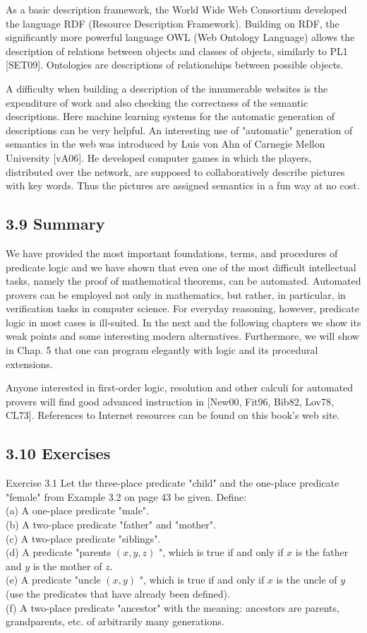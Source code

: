 \documentclass[10pt]{article}
\begin{document}
As a basic description framework, the World Wide Web Consortium developed the language RDF (Resource Description Framework). Building on RDF, the significantly more powerful language OWL (Web Ontology Language) allows the description of relations between objects and classes of objects, similarly to PL1 [SET09]. Ontologies are descriptions of relationships between possible objects.

A difficulty when building a description of the innumerable websites is the expenditure of work and also checking the correctness of the semantic descriptions. Here machine learning systems for the automatic generation of descriptions can be very helpful. An interesting use of "automatic" generation of semantics in the web was introduced by Luis von Ahn of Carnegie Mellon University [vA06]. He developed computer games in which the players, distributed over the network, are supposed to collaboratively describe pictures with key words. Thus the pictures are assigned semantics in a fun way at no cost.

\subsection*{3.9 Summary}
We have provided the most important foundations, terms, and procedures of predicate logic and we have shown that even one of the most difficult intellectual tasks, namely the proof of mathematical theorems, can be automated. Automated provers can be employed not only in mathematics, but rather, in particular, in verification tasks in computer science. For everyday reasoning, however, predicate logic in most cases is ill-suited. In the next and the following chapters we show its weak points and some interesting modern alternatives. Furthermore, we will show in Chap. 5 that one can program elegantly with logic and its procedural extensions.

Anyone interested in first-order logic, resolution and other calculi for automated provers will find good advanced instruction in [New00, Fit96, Bib82, Lov78, CL73]. References to Internet resources can be found on this book's web site.

\subsection*{3.10 Exercises}
Exercise 3.1 Let the three-place predicate "child" and the one-place predicate "female" from Example 3.2 on page 43 be given. Define:\\
(a) A one-place predicate "male".\\
(b) A two-place predicate "father" and "mother".\\
(c) A two-place predicate "siblings".\\
(d) A predicate "parents $(x, y, z)$ ", which is true if and only if $x$ is the father and $y$ is the mother of $z$.\\
(e) A predicate "uncle $(x, y)$ ", which is true if and only if $x$ is the uncle of $y$ (use the predicates that have already been defined).\\
(f) A two-place predicate "ancestor" with the meaning: ancestors are parents, grandparents, etc. of arbitrarily many generations.
\end{document}
